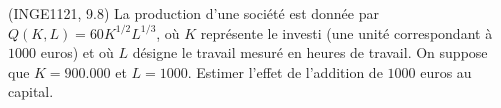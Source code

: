 
\begin{exercice}\label{exoFoncDeuxVar0025}

	(INGE1121, 9.8) La production d'une société est donnée par $Q(K,L)=60K^{1/2}L^{1/3}$, où $K$ représente le  investi (une unité correspondant à $1000$ euros) et où $L$ désigne le travail mesuré en heures de travail. On suppose que $K=900.000$ et $L=1000$. Estimer l'effet de l'addition de $1000$ euros au capital.

\end{exercice}
